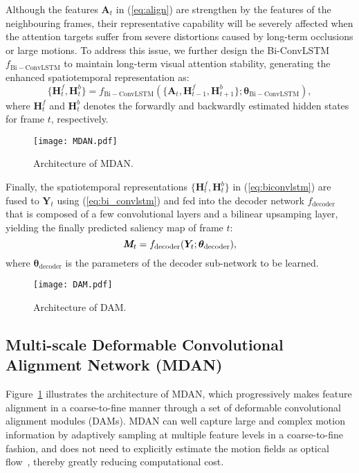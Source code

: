 \documentclass[review]{elsarticle}
\begin{document}
Although the features ${\bm{A}}_t$ in (\ref{eq:align}) are strengthen by the features of the neighbouring frames, their representative capability will be severely affected when the attention targets suffer from severe distortions caused by long-term occlusions or large motions.
To address this issue, we further design the Bi-ConvLSTM $f_{\mathrm{Bi-ConvLSTM}}$ to maintain long-term visual attention stability, generating the enhanced spatiotemporal representation as:
\begin{equation}
\label{eq:biconvlstm}
\{\bm{H}_t^f,\bm{H}_t^b\}=f_{\mathrm{Bi-ConvLSTM}}(\{{\bm{A}}_t, \bm{H}_{t-1}^f, \bm{H}_{t+1}^b\};\bm{\theta}_{\mathrm{Bi-ConvLSTM}}),
\end{equation}
where $\bm{H}_t^f$ and $\bm{H}_t^b$ denotes the forwardly and backwardly estimated hidden states for frame $t$, respectively.
\begin{figure*}[t]
\centering
\texttt{[image: MDAN.pdf]}
\caption{Architecture of MDAN.}
\label{MDAN}
\end{figure*}

Finally, the spatiotemporal representations $\{\bm{H}_t^f,\bm{H}_t^b\}$ in (\ref{eq:biconvlstm}) are fused to $\bm{Y}_t$ using (\ref{eq:bi_convlstm}) and fed into the decoder network $f_{\mathrm{decoder}}$ that is composed of a few convolutional layers and a bilinear upsamping layer, yielding the finally predicted saliency map of frame $t$:
\begin{equation}
\label{eq:encoder}
\textit{\textbf{M}}_t = f_{\mathrm{decoder}}(\bm{Y}_t;\bm{\theta}_{\mathrm{decoder}}),
\end{equation}
where $\bm\theta_{\mathrm{decoder}}$ is the parameters of the decoder sub-network to be learned.
\begin{figure*}[t]
\centering
\texttt{[image: DAM.pdf]}
\caption{Architecture of DAM.}
\label{DAM}
\end{figure*}
\subsection{Multi-scale Deformable Convolutional Alignment Network (MDAN)}
Figure~\ref{MDAN} illustrates the architecture of MDAN, which progressively makes feature alignment in a coarse-to-fine manner through a set of deformable convolutional alignment modules (DAMs).
MDAN can well capture large and complex motion information by adaptively sampling at multiple feature levels in a coarse-to-fine fashion, and does not need to explicitly estimate the motion fields as optical flow~\cite{bak2017spatio,jiang2017predicting,lai2019video,lai2019video}, thereby greatly reducing computational cost.
\end{document}
